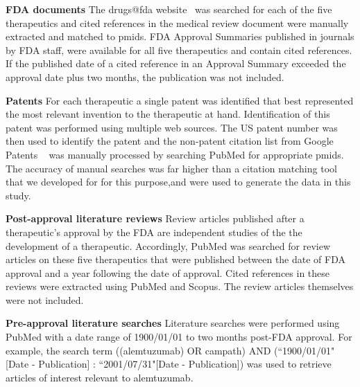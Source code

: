 \documentclass[10pt,letterpaper]{article}
\begin{document}
\textbf{FDA documents} The drugs@fda website~\cite{bibFDA} was searched for each of the five therapeutics and cited references in the medical review document were manually extracted and matched to pmids. FDA Approval Summaries published in journals by FDA staff, were available for all five therapeutics and contain cited references. If the published date of a cited reference in an Approval Summary exceeded the approval date plus two months, the publication was not included.

\textbf{Patents} For each therapeutic a single patent was identified that best represented the most relevant invention to the therapeutic at hand. Identification of this patent was performed using multiple web sources. The US patent number was then used to identify the patent and the non-patent citation list from Google Patents ~\cite{bibGooglePatents} was manually processed by searching PubMed for appropriate pmids. The accuracy of manual searches was far higher than a citation matching tool that we developed for for this purpose,and were used to generate the data in this study.

\textbf{Post-approval literature reviews} Review articles published after a therapeutic's approval by the FDA are independent studies of the the development of a therapeutic. Accordingly, PubMed was searched for review articles on these five therapeutics that were published between the date of FDA approval and a year following the date of approval. Cited references in these reviews were extracted using PubMed and Scopus. The review articles themselves were not included. 

\textbf{Pre-approval literature searches} Literature searches were performed using PubMed with a date range of 1900/01/01 to two months post-FDA approval. For example, the search term ((alemtuzumab) OR campath) AND (``1900/01/01"[Date - Publication] : ``2001/07/31"[Date - Publication]) was used to retrieve articles of interest relevant to alemtuzumab.
\end{document}
